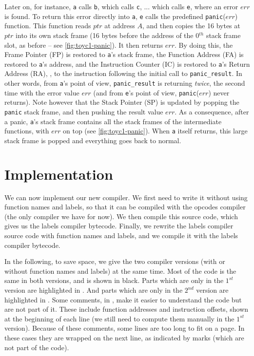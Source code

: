 Later on, for instance, {\tt a} calls {\tt b}, which calls {\tt c}, ... which
calls {\tt e}, where an error $err$ is found. To return this error directly
into {\tt a}, {\tt e} calls the predefined {\tt panic}($err$) function. This
function reads $ptr$ at address $A$, and then copies the 16 bytes at $ptr$ into
its own stack frame (16 bytes before the address of the 0$^{th}$ stack frame
slot, as before -- see \cref{fig:toyc1-panic}). It then returns $err$. By doing
this, the Frame Pointer (FP) is restored to {\tt a}'s stack frame, the Function
Address (FA) is restored to {\tt a}'s address, and the Instruction Counter (IC)
is restored to {\tt a}'s Return Address (RA), \ie, to the instruction following
the initial call to {\tt panic\_result}. In other words, from {\tt a}'s point
of view, {\tt panic\_result} is returning {\em twice}, the second time with the
error value $err$ (and from {\tt e}'s point of view, {\tt panic}($err$) never
returns). Note however that the Stack Pointer (SP) is updated by popping the
{\tt panic} stack frame, and then pushing the result value $err$. As a
consequence, after a panic, {\tt a}'s stack frame contains all the stack frames
of the intermediate functions, with $err$ on top (see \cref{fig:toyc1-panic}).
When {\tt a} itself returns, this large stack frame is popped and everything
goes back to normal.

\section{Implementation}\label{section:toyc1_implementation}


We can now implement our new compiler. We first need to write it without using
function names and labels, so that it can be compiled with the opcodes compiler
(the only compiler we have for now). We then compile this source code, which
gives us the labels compiler bytecode. Finally, we rewrite the labels compiler
source code with function names and labels, and we compile it with the labels
compiler bytecode.

In the following, to save space, we give the two compiler versions (with or
without function names and labels) at the same time. Most of the code is the
same in both versions, and is shown in black. Parts which are only in the
$1^{st}$ version are highlighted in . And parts which are only
in the $2^{nd}$ version are highlighted in . Some comments, in
, make it easier to understand the code but are not part of
it. These include function addresses and instruction offsets, shown at the
beginning of each line (we still need to compute them manually in the $1^{st}$
version). Because of these comments, some lines are too long to fit on a page.
In these cases they are wrapped on the next line, as indicated by \ToyWrap{}
marks (which are not part of the code).

